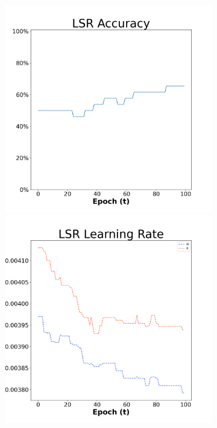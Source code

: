 \begin{figure}[H]
    \centering %
\begin{subfigure}{0.3\textwidth}
  \includegraphics[width=\linewidth]{images/exper1/Sonar/LSR_0.01_acc.png}
    \includegraphics[width=\linewidth]{images/exper1/Sonar/LSR_0.01_lr.png}

\end{subfigure}
\end{figure}
